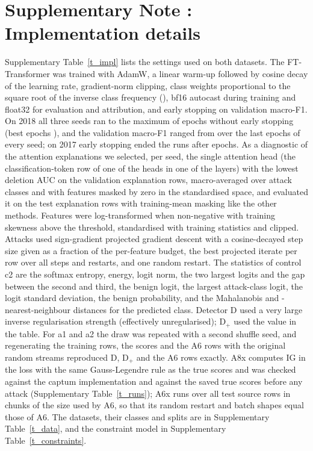 
\section*{Supplementary Note \suppNoteImpl: Implementation details}
\label{sec:si_impl}
Supplementary Table~\ref{t_impl} lists the settings used on both datasets.
The FT-Transformer was trained with AdamW, a linear warm-up followed by cosine decay of the learning rate, gradient-norm
clipping, class weights proportional to the square root of the inverse class frequency (\apClassWeight), bf16
autocast during training and float32 for evaluation and attribution, and early stopping on validation macro-F1.
On 2018 all three seeds ran to the maximum of \apMaxEpochs{} epochs without early stopping (best epochs
\apBestEpochEighteen), and the validation macro-F1 ranged from \valFlatEighteenRange{} over the last
\apPatience{} epochs of every seed; on 2017 early stopping ended the runs after \apEpochsRunSeventeen{} epochs.
As a diagnostic of the attention explanations we selected, per seed, the single attention head (the classification-token
row of one of the \apHeads{} heads in one of the \apBlocks{} layers) with the lowest deletion AUC on the validation
explanation rows, macro-averaged over attack classes and with features masked by zero in the standardised space, and
evaluated it on the test explanation rows with training-mean masking like the other methods.
Features were log-transformed when non-negative with training skewness above the threshold, standardised with training
statistics and clipped.
Attacks used sign-gradient projected gradient descent with a cosine-decayed step size given as a fraction of the
per-feature budget, the best projected iterate per row over all steps and restarts, and one random restart.
The \nConsistency{} statistics of control c2 are the softmax entropy, energy, logit norm, the two largest logits and the
gap between the second and third, the benign logit, the largest attack-class logit, the logit standard deviation, the
benign probability, and the Mahalanobis and \paramKnn{}-nearest-neighbour distances for the predicted class.
Detector D used a very large inverse regularisation strength (effectively unregularised); D$_+$ used the value in the
table.
For a1 and a2 the draw was repeated with a second shuffle seed, and regenerating the training rows, the scores and the
A6 rows with the original random streams reproduced D, D$_+$ and the A6 rows exactly.
A8x computes IG in the loss with the same Gauss-Legendre rule as the true scores and was checked against the captum
implementation and against the saved true scores before any attack (Supplementary Table~\ref{t_runs}); A6x runs over
all test source rows in chunks of the size used by A6, so that its random restart and batch shapes equal those of A6.
The datasets, their classes and splits are in Supplementary Table~\ref{t_data}, and the constraint model in
Supplementary Table~\ref{t_constraints}.

